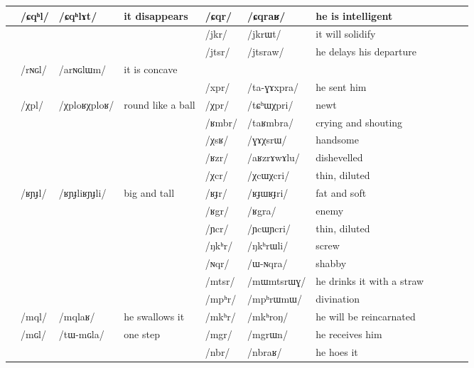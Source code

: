 \documentclass[oldfontcommands,oneside,a4paper,11pt]{article}
\newcommand{\ipa}[1]{\mbox{/#1/}} %
\newcommand{\trois}[1]{/#1/}
\newcommand{\tib}[1]{\cellcolor{lightgray}\textbf{#1}}
\newcommand{\idph}[1]{\cellcolor{gray}\textbf{#1}}
\begin{document}
\begin{landscape}
\begin{longtable}{l|lll|lll|lll|l}
	&\trois{ɕqʰl}  	& \ipa{ɕqʰlɤt}  	&it disappears 	&\trois{ɕqr}  	& \ipa{ɕqraʁ}  	& he is intelligent \\	
\midrule							
	&	&	&	&\trois{jkr}  	& \ipa{jkrɯt}  	& it will solidify \\	
	&	&	&	&\trois{jtsr}  	& \ipa{jtsraw}  	&he delays his departure \\	
\midrule							
	& \trois{rɴɢl}  	& \ipa{arɴɢlɯm}  	&it is concave 	&	&	&\\	
	&	&	&	& \trois{xpr}  	& \ipa{ta-ɣɤxpra}  	&he sent him \\	
\midrule							
	&\trois{χpl} \idph{}	&\ipa{χploʁχploʁ}  	&round like a ball	&\trois{χpr}  	& \ipa{tɕʰɯχpri}  	& newt\\	
	&	&	&	&\trois{ʁmbr}  	& \ipa{taʁmbra}  	& crying and shouting\\	
	&	&	&	&\trois{χsʁ}  	& \ipa{ɣɤχsrɯ}  	& handsome \\	
	&	&	&	&\trois{ʁzr}  	& \ipa{aʁzrɤwɤlu}  	& dishevelled\\	
	&	&	&	&\trois{χcr} \idph{} 	& \ipa{χcɯχcri}  	& thin, diluted \\	
	&\trois{ʁɲɟl}  \idph{}	& \ipa{ʁɲɟliʁɲɟli}  	& big and tall	&\trois{ʁɟr}  \idph{}	& \ipa{ʁɟɯʁɟri}  	& fat and soft\\	
	&	&	&	&\trois{ʁgr} \tib{}  	& \ipa{ʁgra}  	& enemy\\	
\midrule							
	&	&	&	&\trois{ɲcr} \idph{} 	& \ipa{ɲcɯɲcri}  	&thin, diluted \\	
	&	&	&	&\trois{ŋkʰr}  	& \ipa{ŋkʰrɯli}  	&screw \\	
	&	&	&	&\trois{ɴqr}  	& \ipa{ɯ-ɴqra}  	& shabby\\	
\midrule							
	&	&	&	&\trois{mtsr}  	& \ipa{mɯmtsrɯɣ}  	&he drinks it with a straw \\	
	&	&	&	&\trois{mpʰr}  	& \ipa{mpʰrɯmɯ}  	& divination\\	
	&\trois{mql}  	& \ipa{mqlaʁ}  	& he swallows it	&\trois{mkʰr}  	& \ipa{mkʰroŋ}  	&he will be reincarnated \\	
	&\trois{mɢl}  	& \ipa{tɯ-mɢla}  	& one step	&\trois{mgr}  	& \ipa{mgrɯn}  	& he receives him\\	
\midrule							
	&	&	&	&\trois{nbr}  	& \ipa{nbraʁ}  	&he hoes it \\	
\end{longtable}	


\end{landscape}
\end{document}
